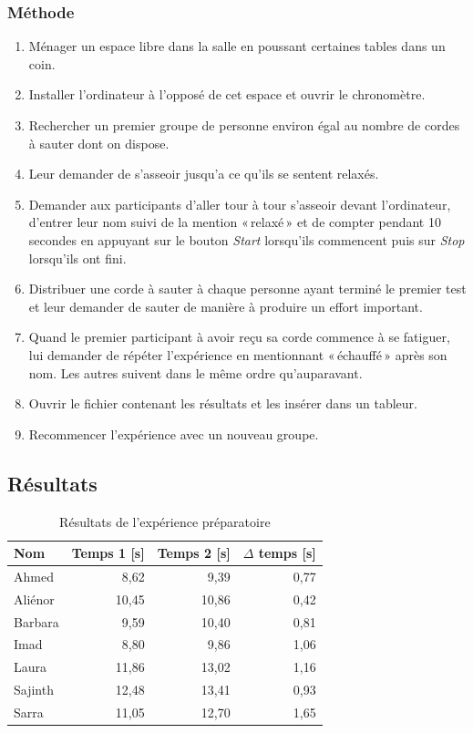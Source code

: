 \documentclass[12pt,fleqn,oneside,openany]{book} %
\begin{document}
\subsubsection{Méthode} \label{sssec:methode2.1}
\begin{enumerate}
	\item Ménager un espace libre dans la salle en poussant certaines tables dans un coin.
	\item Installer l'ordinateur à l'opposé de cet espace et ouvrir le chronomètre.
	\item Rechercher un premier groupe de personne environ égal au nombre de cordes à sauter dont on dispose.
	\item Leur demander de s'asseoir jusqu'a ce qu'ils se sentent relaxés.
	\item Demander aux participants d'aller tour à tour s'asseoir devant l'ordinateur, d'entrer leur nom suivi de la mention «\,relaxé\,» et de compter pendant 10 secondes en appuyant sur le bouton \emph{Start} lorsqu'ils commencent puis sur \emph{Stop} lorsqu'ils ont fini.
	\item Distribuer une corde à sauter à chaque personne ayant terminé le premier test et leur demander de sauter de manière à produire un effort important.
	\item Quand le premier participant à avoir reçu sa corde commence à se fatiguer, lui demander de répéter l'expérience en mentionnant «\,échauffé\,» après son nom. Les autres suivent dans le même ordre qu'auparavant.
	\item Ouvrir le fichier contenant les résultats et les insérer dans un tableur.
	\item Recommencer l'expérience avec un nouveau groupe.
\end{enumerate}

\subsection{Résultats} \label{ssec:resultats2.1}

\begin{table}[h]
	\centering
	\caption{Résultats de l'expérience préparatoire} \label{tbl:exp2.1}
	\begin{tabular}{lrrr}
		\toprule 
		\textbf{Nom} & \textbf{Temps 1 [s]} & \textbf{Temps 2 [s]} & \textbf{$\Delta$ temps [s]} \\ \midrule
		Ahmed & 8,62 & 9,39 & 0,77 \\
		Aliénor & 10,45 & 10,86 & 0,42 \\
		Barbara & 9,59 & 10,40 & 0,81 \\
		Imad & 8,80 & 9,86 & 1,06 \\
		Laura & 11,86 & 13,02 & 1,16 \\
		Sajinth & 12,48 & 13,41 & 0,93 \\
		Sarra & 11,05 & 12,70 & 1,65 \\ \bottomrule
	\end{tabular}
\end{table}
\end{document}
